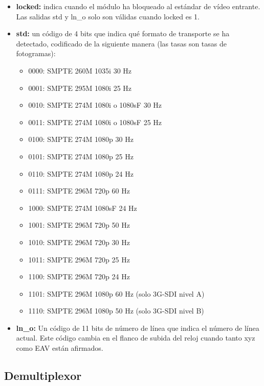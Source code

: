 \begin{itemize}
    \item \textbf{locked:} indica cuando el módulo ha bloqueado al estándar de
    vídeo entrante. Las salidas std y ln\_o solo son válidas cuando locked es 1.
    \item \textbf{std:} un código de 4 bits que indica qué formato de transporte
    se ha detectado, codificado de la siguiente manera (las tasas son tasas de
    fotogramas):
    \begin{itemize}
        \item 0000: SMPTE 260M 1035i           30 Hz
        \item 0001: SMPTE 295M 1080i           25 Hz
        \item 0010: SMPTE 274M 1080i o 1080sF  30 Hz
        \item 0011: SMPTE 274M 1080i o 1080sF  25 Hz
        \item 0100: SMPTE 274M 1080p           30 Hz   
        \item 0101: SMPTE 274M 1080p           25 Hz   
        \item 0110: SMPTE 274M 1080p           24 Hz
        \item 0111: SMPTE 296M 720p            60 Hz
        \item 1000: SMPTE 274M 1080sF          24 Hz
        \item 1001: SMPTE 296M 720p            50 Hz
        \item 1010: SMPTE 296M 720p            30 Hz
        \item 1011: SMPTE 296M 720p            25 Hz
        \item 1100: SMPTE 296M 720p            24 Hz
        \item 1101: SMPTE 296M 1080p           60 Hz    (solo 3G-SDI nivel A)
        \item 1110: SMPTE 296M 1080p           50 Hz    (solo 3G-SDI nivel B)
    \end{itemize}
    \item \textbf{ln\_o:} Un código de 11 bits de número de línea que indica el
    número de línea actual. Este código cambia en el flanco de subida del reloj
    cuando tanto xyz como EAV están afirmados.
\end{itemize}

\subsection{Demultiplexor}

